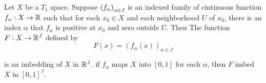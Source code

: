\begin{theorem}
    Let $X$ be a $T_1$ space. Suppose $\sequence{f_\alpha}_{\alpha \in J}$ is an indexed family of cintinuous function $f_\alpha : X \rightarrow \mathbb{R}$ such that for each $x_0\in X$ and each neighborhood $U$ of $x_0$, there is an index $\alpha$ that $f_\alpha$ is positive at $x_0$ and zero outside $U$. Then The function $F: X \rightarrow \mathbb{R}^J$ defined by 
    \begin{equation}
        F(x) = \left(f_\alpha(x)\right)_{\alpha \in J}
    \end{equation}
    
    is an imbedding of $X$ in $\mathbb{R}^J$. if $f_\alpha$ maps $X$ into $[0,1]$ for each $\alpha$, then $F$ imbed $X$ in $[0,1]^J$.
\end{theorem}


